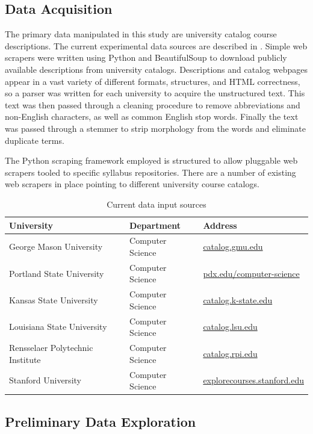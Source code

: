\subsection{Data Acquisition}

The primary data manipulated in this study are university catalog course
descriptions. The current experimental data sources are described in
. Simple web scrapers were written using Python
and BeautifulSoup to download publicly available descriptions from
university catalogs. Descriptions and catalog webpages appear in a vast
variety of different formats, structures, and HTML correctness, so a parser
was written for each university to acquire the unstructured text. This text
was then passed through a cleaning procedure to remove abbreviations and
non-English characters, as well as common English stop words. Finally the
text was passed through a stemmer to strip morphology from the words and
eliminate duplicate terms.

The Python scraping framework employed is structured to allow pluggable web
scrapers tooled to specific syllabus repositories. There are a number of
existing web scrapers in place pointing to different university course
catalogs.

\begin{table}[ht]
\centering
\begin{tabular}{lll}
\toprule
University & Department & Address \\
\midrule
George Mason University & Computer Science & \url{catalog.gmu.edu} \\
Portland State University & Computer Science & \url{pdx.edu/computer-science} \\
Kansas State University & Computer Science & \url{catalog.k-state.edu} \\
Louisiana State University & Computer Science & \url{catalog.lsu.edu} \\
Rensselaer Polytechnic Institute & Computer Science & \url{catalog.rpi.edu} \\
Stanford University & Computer Science & \url{explorecourses.stanford.edu} \\
\bottomrule
\end{tabular}
\caption{Current data input sources\label{table:data-sources}}
\end{table}


\subsection{Preliminary Data Exploration}

